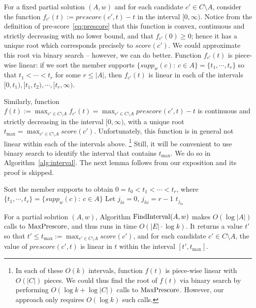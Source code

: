For a fixed partial solution $(A,w)$ and for each candidate $c'\in C\setminus A$, consider the function 
$f_{c'}(t):=prescore(c',t)-t$ in the interval $[0,\infty)$. 
Notice from the definition of pre-score~\eqref{eq:prescore} that this function is convex, continuous and strictly decreasing with no lower bound, and that $f_{c'}(0)\geq 0$; hence it has a unique root which corresponds precisely to $score(c')$. We could approximate this root via binary search -- however, we can do better. 
Function $f_{c'}(t)$ is piece-wise linear: if we sort the member supports $\{supp_w(c): \ c\in A\}=\{t_1, \cdots, t_r\}$ so that $t_1 < \cdots < t_r$ for some $r\leq |A|$, then $f_{c'}(t)$ is linear in each of the intervals $[0, t_1), [t_1, t_2), \cdots, [t_r, \infty)$.

Similarly, function $f(t):= \max_{c'\in C\setminus A} f_{c'}(t) = \max_{c'\in C\setminus A} prescore(c',t) -t$ is continuous and strictly decreasing in the interval $[0,\infty)$, with a unique root $t_{\max}=\max_{c'\in C\setminus A} score(c')$. Unfortunately, this function is in general not linear within each of the intervals above.%
%
\footnote{In each of these $O(k)$ intervals, function $f(t)$ is piece-wise linear with $O(|C|)$ pieces. We could thus find the root of $f(t)$ via binary search by performing $O(\log k + \log |C|)$ calls to $\operatorname{MaxPrescore}$. However, our approach only requires $O(\log k)$ such calls.} %
%
Still, it will be convenient to use binary search to identify the interval that contains $t_{\max}$. We do so in Algorithm~\ref{alg:interval}. The next lemma follows from our exposition and its proof is skipped.

\begin{algorithm}[htb]\label{alg:interval}
\SetAlgoLined
{}
Sort the member supports to obtain $0=t_0<t_1<\cdots <t_r$, where $\{t_1, \cdots, t_r\}=\{supp_w(c): \ c\in A\}$\;
Let $j_{lo}=0$, $j_{hi}=r-1$\;
\Return $t_{j_{lo}}$\;

 \caption{$\interval(A,w)$}
\end{algorithm}

\begin{lemma}\label{lem:interval}
For a partial solution $(A,w)$, Algorithm $\interval(A,w)$ makes $O(\log |A|)$ calls to $\operatorname{MaxPrescore}$, and thus runs in time $O(|E|\cdot \log k)$. It returns a value $t'$ so that $t'\leq t_{\max}:=\max_{c'\in C\setminus A} score(c')$, and for each candidate $c'\in C\setminus A$, the value of $prescore(c',t)$ is linear in $t$ within the interval $[t',t_{\max}]$.
\end{lemma}

